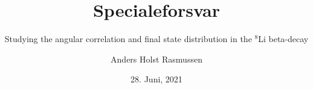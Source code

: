 \documentclass{beamer}
\title{Specialeforsvar}
\subtitle{Studying the angular correlation and final state distribution in the $^8$Li beta-decay }
\author{Anders Holst Rasmussen}
\date{28. Juni, 2021}
\begin{document}
\frame\titlepage





\end{document}
